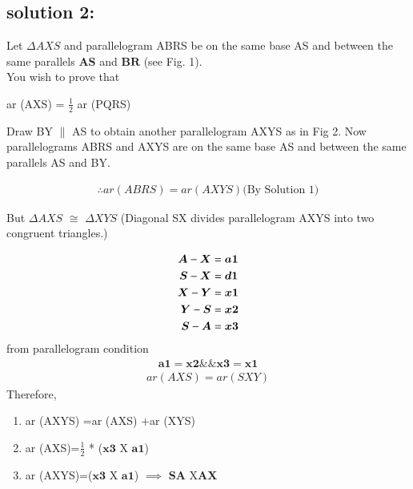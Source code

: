 \documentclass{article}
\begin{document}
\begin{multicols}{2}
\section*{solution 2:}
\begin{flushleft}
Let $\Delta{AXS}$ and parallelogram ABRS be on the same base AS and between the same parallels $\boldsymbol{AS}$ and $\boldsymbol{BR}$ (see Fig. 1).\\
You wish to prove that
\end{flushleft}
ar (AXS) = $\frac{1}{2}$ ar (PQRS)\\
\begin{flushleft}
Draw BY $\parallel$ AS to obtain another parallelogram AXYS as in Fig 2. Now parallelograms ABRS and AXYS are on the same base AS and between the same parallels AS and BY.
\end{flushleft}
\begin{align}
\therefore ar (ABRS) = ar (AXYS) \text{(By Solution 1)}
\end{align}
\begin{flushleft}
But $\Delta{AXS}$ $\cong$ $\Delta{XYS}$ (Diagonal SX divides parallelogram AXYS into two congruent triangles.)
\end{flushleft}
\begin{align}
           \boldsymbol{A}-\boldsymbol{X}&=\boldsymbol{a1} \hfill \\
           \boldsymbol{S}-\boldsymbol{X}&=\boldsymbol{d1}  \hfill \\
           \boldsymbol{X}-\boldsymbol{Y}&=\boldsymbol{x1}  \hfill \\
           \boldsymbol{Y}-\boldsymbol{S}&=\boldsymbol{x2} \hfill\\
           \boldsymbol{S}-\boldsymbol{A}&=\boldsymbol{x3} 
\end{align}           
\hspace{-2cm}from parallelogram condition 
\begin{align}
\boldsymbol{a1}=\boldsymbol{x2} \&\&  \boldsymbol{x3}=\boldsymbol{x1}
\end{align}
\begin{align}
ar (AXS) = ar (SXY)
\end{align}
\hspace{-2cm}Therefore,
\begin{enumerate}
\item[]ar (AXYS) =ar (AXS) +ar (XYS)
\item[]ar (AXS)=$\frac{1}{2}$ * ($\boldsymbol{x3}$ X $\boldsymbol{a1}$)
\item[]ar (AXYS)=($\boldsymbol{x3}$  X $\boldsymbol{a1}$) $\implies$ $\boldsymbol{SA}$ X$\boldsymbol{AX}$ 

\end{enumerate}
\end{multicols}
\end{document}
